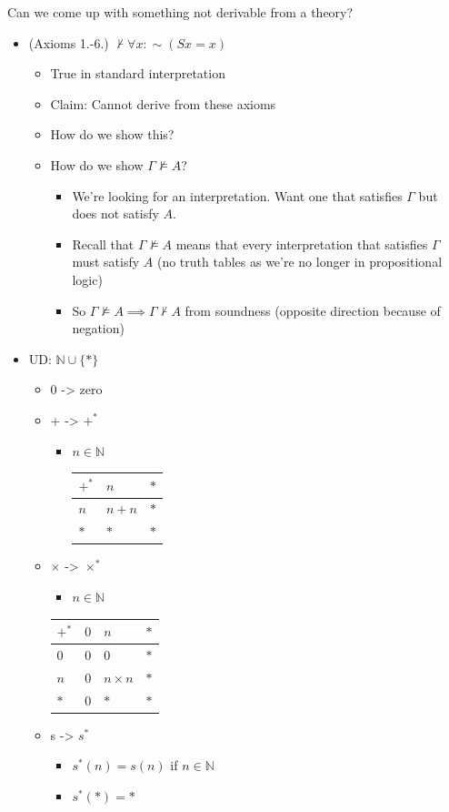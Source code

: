 \documentclass[11pt]{article}
\begin{document}
Can we come up with something not derivable from a theory?
\begin{itemize}
\item (Axioms 1.-6.) \(\nvdash \forall x: \sim(Sx = x)\)
\begin{itemize}
\item True in standard interpretation
\item Claim: Cannot derive from these axioms
\item How do we show this?
\item How do we show \(\Gamma \nvDash A\)?
\begin{itemize}
\item We're looking for an interpretation. Want one that satisfies \(\Gamma\) but does not satisfy \(A\).
\item Recall that \(\Gamma \nvDash A\) means that every interpretation that satisfies \(\Gamma\) must satisfy \(A\) (no truth tables as we're no longer in propositional logic)
\item So \(\Gamma \nvDash A \implies \Gamma \nvdash A\) from soundness (opposite direction because of negation)
\end{itemize}
\end{itemize}
\item UD: \(\mathbb{N}\cup \{*\}\)
\begin{itemize}
\item 0 -> zero
\item + -> \(+^*\)
\begin{itemize}
\item \(n \in \mathbb{N}\)

\begin{tabular}{l|l l}
  $+^*$ & $n$ & $*$
  \\ \hline $n$ & $n+n$ & $*$
  \\ $*$ & $*$ & $*$
\end{tabular}
\end{itemize}

\item \(\times\) -> \(\times^*\)
\begin{itemize}
\item \(n \in \mathbb{N}\)
\end{itemize}

\begin{tabular}{l|l l l}
    $+^*$ & $0$ & $n$ & $*$
    \\ \hline $0$ & $0$ & $0$ & $*$
    \\ $n$ & $0$ & $n \times n$ & $*$
    \\ $*$ & $0$ & $*$ & $*$
\end{tabular}
\item s -> \(s^*\)
\begin{itemize}
\item \(s^*(n) = s(n)\) if \(n\in \mathbb{N}\)
\item \(s^*(*) = *\)
\end{itemize}
\end{itemize}
\end{itemize}
\end{document}
